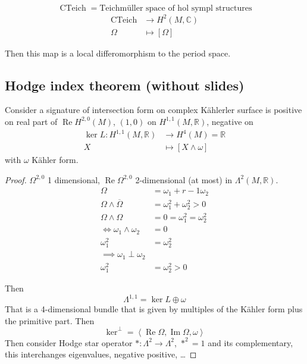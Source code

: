 \[\operatorname{CTeich}=\text{Teichmüller space of hol sympl structures} \]
\begin{align*}
	\operatorname{CTeich} &\longrightarrow H^{2}(M,\mathbb{C}) \\
	\Omega &\longmapsto [\Omega ]
\end{align*}

Then this map is a local differomorphism to the period space.

\subsection{Hodge index theorem (without slides)}

\begin{thm}\leavevmode
	Consider a signature of intersection form on complex K\"ahlerler surface is positive on real part of $\operatorname{Re}H^{2,0}(M)$, $(1,0)$ on  $H^{1,1}(M,\mathbb{R})$, negative on 
	\begin{align*}
		\ker L:H^{1,1}(M,\mathbb{R})  &\longrightarrow H^{4}(M) =\mathbb{R}\\
		X &\longmapsto [X\wedge \omega ]
	\end{align*}
	with $\omega$ Kähler form.
	
\end{thm}

\begin{proof}
	$\Omega^{2,0}$ 1 dimensional, $\operatorname{Re}\Omega^{2,0}$ 2-dimensional (at most) in $\Lambda^2(M,\mathbb{R})$.
	\begin{align*}
		\Omega&=\omega_1+r-1\omega_2\\
		\Omega \wedge  \overline{\Omega}&=\omega_1^2+\omega_2^2>0\\
		\Omega \wedge \Omega &=0=\omega_1^2=\omega^2_2\\
		\iff \omega_1\wedge \omega_2&=0\\
		\omega_1^2&=\omega_2^2\\
		\implies \omega_1\perp \omega_2\\
		\omega_1^2&=\omega_2^2>0
	\end{align*}

	Then 
	\[\Lambda^{1,1}=\ker L\oplus \omega\]
	That is a 4-dimensional bundle that is given by multiples of the K\"ahler form plus the primitive part. Then
	\[\ker^\perp=\left<\operatorname{Re} \Omega,\operatorname{Im}\Omega,\omega\right> \]
	Then consider Hodge star operator $*:\Lambda^2\to \Lambda^2$, $*^2=1$ and its complementary, this interchanges eigenvalues, negative positive, …
\end{proof}

